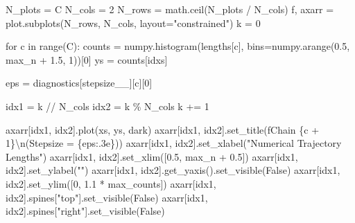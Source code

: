 \documentclass[
  letterpaper,
  DIV=11,
  numbers=noendperiod]{scrartcl}
\newenvironment{Shaded}{\begin{snugshade}}{\end{snugshade}}
\newcommand{\BuiltInTok}[1]{\textcolor[rgb]{0.00,0.23,0.31}{#1}}
\newcommand{\CharTok}[1]{\textcolor[rgb]{0.13,0.47,0.30}{#1}}
\newcommand{\ControlFlowTok}[1]{\textcolor[rgb]{0.00,0.23,0.31}{#1}}
\newcommand{\DecValTok}[1]{\textcolor[rgb]{0.68,0.00,0.00}{#1}}
\newcommand{\FloatTok}[1]{\textcolor[rgb]{0.68,0.00,0.00}{#1}}
\newcommand{\KeywordTok}[1]{\textcolor[rgb]{0.00,0.23,0.31}{#1}}
\newcommand{\NormalTok}[1]{\textcolor[rgb]{0.00,0.23,0.31}{#1}}
\newcommand{\OperatorTok}[1]{\textcolor[rgb]{0.37,0.37,0.37}{#1}}
\newcommand{\SpecialCharTok}[1]{\textcolor[rgb]{0.37,0.37,0.37}{#1}}
\newcommand{\SpecialStringTok}[1]{\textcolor[rgb]{0.13,0.47,0.30}{#1}}
\newcommand{\StringTok}[1]{\textcolor[rgb]{0.13,0.47,0.30}{#1}}
\newcommand{\VariableTok}[1]{\textcolor[rgb]{0.07,0.07,0.07}{#1}}
\begin{document}
\begin{Shaded}
\begin{Highlighting}[]
\NormalTok{  N\_plots }\OperatorTok{=}\NormalTok{ C}
\NormalTok{  N\_cols }\OperatorTok{=} \DecValTok{2}
\NormalTok{  N\_rows }\OperatorTok{=}\NormalTok{ math.ceil(N\_plots }\OperatorTok{/}\NormalTok{ N\_cols)}
\NormalTok{  f, axarr }\OperatorTok{=}\NormalTok{ plot.subplots(N\_rows, N\_cols, layout}\OperatorTok{=}\StringTok{"constrained"}\NormalTok{)}
\NormalTok{  k }\OperatorTok{=} \DecValTok{0}
  
  \ControlFlowTok{for}\NormalTok{ c }\KeywordTok{in} \BuiltInTok{range}\NormalTok{(C):}
\NormalTok{    counts }\OperatorTok{=}\NormalTok{ numpy.histogram(lengths[c], }
\NormalTok{                             bins}\OperatorTok{=}\NormalTok{numpy.arange(}\FloatTok{0.5}\NormalTok{, max\_n }\OperatorTok{+} \FloatTok{1.5}\NormalTok{, }\DecValTok{1}\NormalTok{))[}\DecValTok{0}\NormalTok{]}
\NormalTok{    ys }\OperatorTok{=}\NormalTok{ counts[idxs]}
    
\NormalTok{    eps }\OperatorTok{=}\NormalTok{ diagnostics[}\StringTok{\textquotesingle{}stepsize\_\_\textquotesingle{}}\NormalTok{][c][}\DecValTok{0}\NormalTok{]}
    
\NormalTok{    idx1 }\OperatorTok{=}\NormalTok{ k }\OperatorTok{//}\NormalTok{ N\_cols}
\NormalTok{    idx2 }\OperatorTok{=}\NormalTok{ k }\OperatorTok{\%}\NormalTok{ N\_cols}
\NormalTok{    k }\OperatorTok{+=} \DecValTok{1}
    
\NormalTok{    axarr[idx1, idx2].plot(xs, ys, dark)}
\NormalTok{    axarr[idx1, idx2].set\_title(}\SpecialStringTok{f\textquotesingle{}Chain }\SpecialCharTok{\{}\NormalTok{c }\OperatorTok{+} \DecValTok{1}\SpecialCharTok{\}}\CharTok{\textbackslash{}n}\SpecialStringTok{(Stepsize = }\SpecialCharTok{\{}\NormalTok{eps}\SpecialCharTok{:.3e\}}\SpecialStringTok{)\textquotesingle{}}\NormalTok{)}
\NormalTok{    axarr[idx1, idx2].set\_xlabel(}\StringTok{"Numerical Trajectory Lengths"}\NormalTok{)}
\NormalTok{    axarr[idx1, idx2].set\_xlim([}\FloatTok{0.5}\NormalTok{, max\_n }\OperatorTok{+} \FloatTok{0.5}\NormalTok{])}
\NormalTok{    axarr[idx1, idx2].set\_ylabel(}\StringTok{""}\NormalTok{)}
\NormalTok{    axarr[idx1, idx2].get\_yaxis().set\_visible(}\VariableTok{False}\NormalTok{)}
\NormalTok{    axarr[idx1, idx2].set\_ylim([}\DecValTok{0}\NormalTok{, }\FloatTok{1.1} \OperatorTok{*}\NormalTok{ max\_counts])}
\NormalTok{    axarr[idx1, idx2].spines[}\StringTok{"top"}\NormalTok{].set\_visible(}\VariableTok{False}\NormalTok{)}
\NormalTok{    axarr[idx1, idx2].spines[}\StringTok{"right"}\NormalTok{].set\_visible(}\VariableTok{False}\NormalTok{)}
  
\end{Highlighting}
\end{Shaded}
\end{document}
